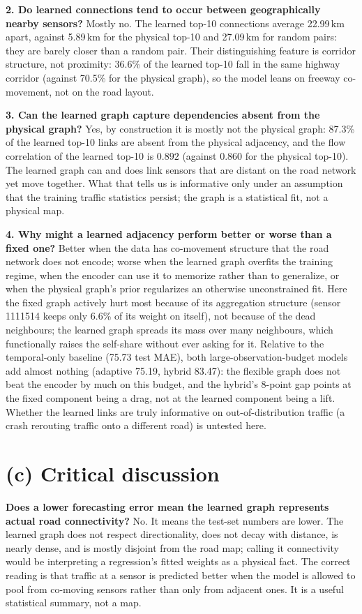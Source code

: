 \documentclass[11pt,letterpaper]{article}
\begin{document}
\textbf{2. Do learned connections tend to occur between geographically nearby sensors?}
Mostly no. The learned top-10 connections average 22.99\,km apart, against 5.89\,km for the
physical top-10 and 27.09\,km for random pairs: they are barely closer than a random pair.
Their distinguishing feature is corridor structure, not proximity: 36.6\% of the learned
top-10 fall in the same highway corridor (against 70.5\% for the physical graph), so the
model leans on freeway co-movement, not on the road layout.

\textbf{3. Can the learned graph capture dependencies absent from the physical graph?}
Yes, by construction it is mostly not the physical graph: 87.3\% of the learned top-10 links
are absent from the physical adjacency, and the flow correlation of the learned top-10 is
$0.892$ (against $0.860$ for the physical top-10). The learned graph can and does link
sensors that are distant on the road network yet move together. What that tells us is
informative only under an assumption that the training traffic statistics persist; the
graph is a statistical fit, not a physical map.

\textbf{4. Why might a learned adjacency perform better or worse than a fixed one?}
Better when the data has co-movement structure that the road network does not encode; worse
when the learned graph overfits the training regime, when the encoder can use it to memorize
rather than to generalize, or when the physical graph's prior regularizes an otherwise
unconstrained fit. Here the fixed graph actively hurt most because of its aggregation
structure (sensor 1111514 keeps only 6.6\% of its weight on itself), not because of the
dead neighbours; the learned graph spreads its mass over many neighbours, which
functionally raises the self-share without ever asking for it. Relative to the
temporal-only baseline (75.73 test MAE), both large-observation-budget models add almost
nothing (adaptive 75.19, hybrid 83.47): the flexible graph does not beat the encoder by
much on this budget, and the hybrid's 8-point gap points at the fixed component being a
drag, not at the learned component being a lift. Whether the learned links are truly
informative on out-of-distribution traffic (a crash rerouting traffic onto a different road)
is untested here.

\section*{(c) Critical discussion}

\textbf{Does a lower forecasting error mean the learned graph represents actual road
connectivity?} No. It means the test-set numbers are lower. The learned graph does not
respect directionality, does not decay with distance, is nearly dense, and is mostly
disjoint from the road map; calling it connectivity would be interpreting a regression's
fitted weights as a physical fact. The correct reading is that traffic at a sensor is
predicted better when the model is allowed to pool from co-moving sensors rather than only
from adjacent ones. It is a useful statistical summary, not a map.
\end{document}
